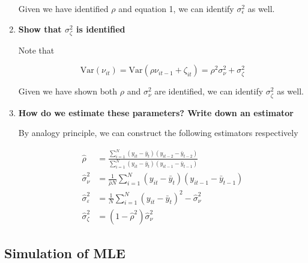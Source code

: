 \documentclass[11pt]{article}
\newcommand{\var}{\text{Var}}
\begin{document}
\begin{enumerate}
                Given we have identified $\rho$ and equation 1, we can identify $\sigma_{\epsilon}^2$ as well.

            \item{\bf Show that $\sigma_{\zeta}^2$ is identified}
            
                Note that
                
                \[
                    \var(\nu_{it}) = \var(\rho\nu_{it-1} + \zeta_{it}) = \rho^2\sigma_\nu^2 + \sigma_\zeta^2
                \]

                Given we have shown both $\rho$ and $\sigma_\nu^2$ are identified, we can identify $\sigma_\zeta^2$ as well.

            \item{\bf How do we estimate these parameters? Write down an estimator}
            
                By analogy principle, we can construct the following estimators respectively

                \[ \begin{aligned}
                    \hat{\rho} &= \frac{\sum_{i=1}^{N} (y_{it} - \bar{y}_{t})(y_{it-2} - \bar{y}_{t-2})}{\sum_{i=1}^{N} (y_{it} - \bar{y}_{t})(y_{it-1} - \bar{y}_{t-1})} \\
                    \hat{\sigma}^2_{\nu} &= \frac{1}{\hat{\rho}N} \sum_{i=1}^{N} (y_{it} - \bar{y}_{t})(y_{it-1} - \bar{y}_{t-1}) \\
                    \hat{\sigma}^2_{\varepsilon} &= \frac{1}{N} \sum_{i=1}^{N} (y_{it} - \bar{y}_{t})^2 - \hat{\sigma}^2_{\nu} \\
                    \hat{\sigma}^2_{\zeta} &= (1 - \hat{\rho}^2)\hat{\sigma}^2_{\nu}
                \end{aligned} \]
        
        \end{enumerate}

    
    \subsection{Simulation of MLE}
\end{document}
